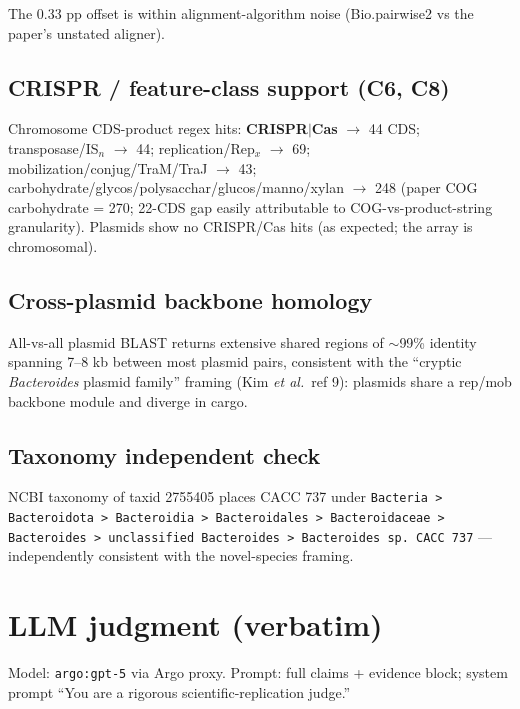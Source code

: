 \documentclass[11pt,letterpaper]{article}
\begin{document}
The 0.33 pp offset is within alignment-algorithm noise (Bio.pairwise2 vs the paper's unstated aligner).

\subsection{CRISPR / feature-class support (C6, C8)}
Chromosome CDS-product regex hits: \textbf{CRISPR$|$Cas} $\to$ 44 CDS; transposase/IS$_n$ $\to$ 44; replication/Rep$_x$ $\to$ 69; mobilization/conjug/TraM/TraJ $\to$ 43; carbohydrate/glycos/polysacchar/glucos/manno/xylan $\to$ 248 (paper COG carbohydrate = 270; 22-CDS gap easily attributable to COG-vs-product-string granularity). Plasmids show no CRISPR/Cas hits (as expected; the array is chromosomal).

\subsection{Cross-plasmid backbone homology}
All-vs-all plasmid BLAST returns extensive shared regions of $\sim$99\% identity spanning 7--8 kb between most plasmid pairs, consistent with the ``cryptic \textit{Bacteroides} plasmid family'' framing (Kim \textit{et al.}\ ref 9): plasmids share a rep/mob backbone module and diverge in cargo.

\subsection{Taxonomy independent check}
NCBI taxonomy of taxid 2755405 places CACC 737 under \texttt{Bacteria > Bacteroidota > Bacteroidia > Bacteroidales > Bacteroidaceae > Bacteroides > unclassified Bacteroides > Bacteroides sp. CACC 737} --- independently consistent with the novel-species framing.

\section{LLM judgment (verbatim)}
Model: \texttt{argo:gpt-5} via Argo proxy. Prompt: full claims + evidence block; system prompt ``You are a rigorous scientific-replication judge.''
\end{document}
